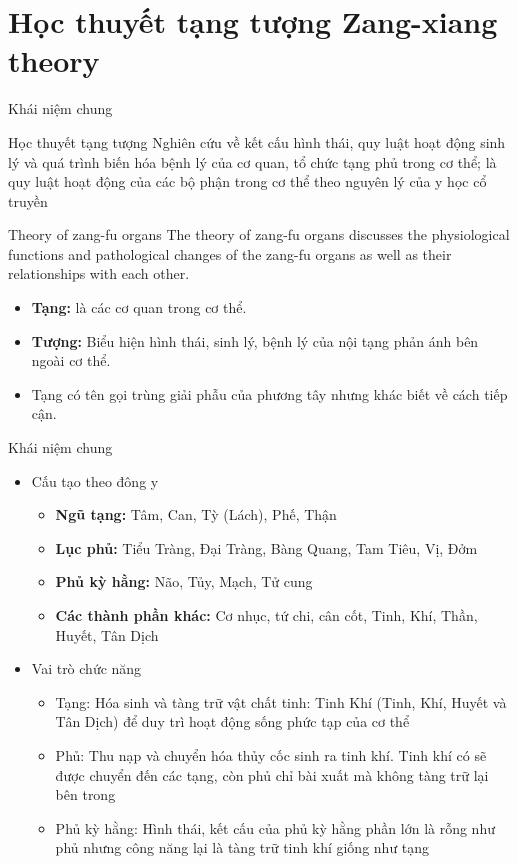 \documentclass[
	11pt, %
]{beamer}
\theoremstyle{newblock}
\begin{document}
\section{Học thuyết tạng tượng \newline  Zang-xiang theory}
\begin{frame}[plain]
	\Huge{}
\end{frame}
\begin{frame}{Khái niệm chung}
	\begin{block}{Học thuyết tạng tượng}
		Nghiên cứu về kết cấu hình thái, quy luật hoạt động sinh lý và quá trình biến hóa bệnh lý của cơ quan, tổ chức tạng phủ trong cơ thể; là quy luật hoạt động của các bộ phận trong cơ thể theo nguyên lý của y học cổ truyền 
	\end{block}
	\begin{block}{Theory of zang-fu organs}
		The theory of zang-fu organs discusses the physiological functions and pathological changes of the zang-fu organs as well as their relationships with each other.
	\end{block}
	\small{
		\begin{itemize}
			\item {\bf Tạng:} là các cơ quan trong cơ thể.
			\item {\bf Tượng:} Biểu hiện hình thái, sinh lý, bệnh lý của nội tạng phản ánh bên ngoài cơ thể.
			\item Tạng có tên gọi trùng giải phẫu của phương tây nhưng khác biết về cách tiếp cận.
		\end{itemize}
	}
\end{frame}
\begin{frame}{Khái niệm chung}
	\begin{itemize}
		\item Cấu tạo theo đông y
		\begin{itemize}
			\item {\bf Ngũ tạng:} Tâm, Can, Tỳ (Lách), Phế, Thận 
			\item {\bf Lục phủ:} Tiểu Tràng, Đại Tràng, Bàng Quang, Tam Tiêu, Vị, Đởm
			\item {\bf Phủ kỳ hằng:} Não, Tủy, Mạch, Tử cung
			\item {\bf Các thành phần khác:} Cơ nhục, tứ chi, cân cốt, Tinh, Khí, Thần, Huyết, Tân Dịch
		\end{itemize}
		\item Vai trò chức năng
		\begin{itemize}
			\item Tạng: Hóa sinh và tàng trữ vật chất tinh:  Tinh Khí (Tinh, Khí, Huyết và Tân Dịch) để duy trì hoạt động sống phức tạp của cơ thể
			\item Phủ: Thu nạp và chuyển hóa thủy cốc sinh ra tinh khí. Tinh khí có sẽ được chuyển đến các tạng, còn phủ chỉ bài xuất mà không tàng trữ lại bên trong
			\item Phủ kỳ hằng: Hình thái, kết cấu của phủ kỳ hằng phần lớn là rỗng như phủ nhưng công năng lại là tàng trữ tinh khí giống như tạng
		\end{itemize}
	\end{itemize}
\end{frame}
\end{document}
